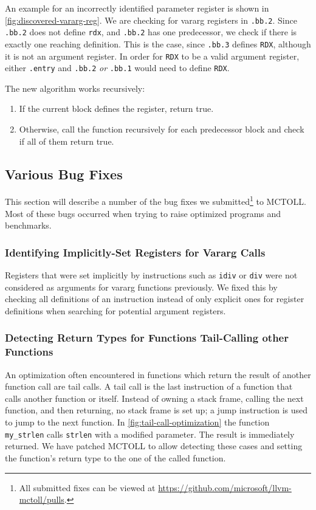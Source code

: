 An example for an incorrectly identified parameter register is shown in \cref{fig:discovered-vararg-reg}.
We are checking for vararg registers in \texttt{.bb.2}.
Since \texttt{.bb.2} does not define \texttt{rdx}, and \texttt{.bb.2} has one predecessor, we check if there is exactly one reaching definition.
This is the case, since \texttt{.bb.3} defines \texttt{RDX}, although it is not an argument register.
In order for \texttt{RDX} to be a valid argument register, either \texttt{.entry} and \texttt{.bb.2} \textit{or} \texttt{.bb.1} would need to define \texttt{RDX}.

The new algorithm works recursively:
\begin{enumerate}
    \item If the current block defines the register, return true.
    \item Otherwise, call the function recursively for each predecessor block and check if all of them return true.
\end{enumerate}

\subsection{Various Bug Fixes}\label{subsec:various-bug-fixes}

This section will describe a number of the bug fixes we submitted\footnote{All submitted fixes can be viewed at \url{https://github.com/microsoft/llvm-mctoll/pulls}.} to MCTOLL.
Most of these bugs occurred when trying to raise optimized programs and benchmarks.

\subsubsection{Identifying Implicitly-Set Registers for Vararg Calls}

Registers that were set implicitly by instructions such as \texttt{idiv} or \texttt{div} were not considered as arguments for vararg functions previously.
We fixed this by checking all definitions of an instruction instead of only explicit ones for register definitions when searching for potential argument registers.

\subsubsection{Detecting Return Types for Functions Tail-Calling other Functions}

An optimization often encountered in functions which return the result of another function call are tail calls.
A tail call is the last instruction of a function that calls another function or itself.
Instead of owning a stack frame, calling the next function, and then returning, no stack frame is set up;
a jump instruction is used to jump to the next function.
In \cref{fig:tail-call-optimization} the function \texttt{my\_strlen} calls \texttt{strlen} with a modified parameter.
The result is immediately returned.
We have patched MCTOLL to allow detecting these cases and setting the function's return type to the one of the called function.

